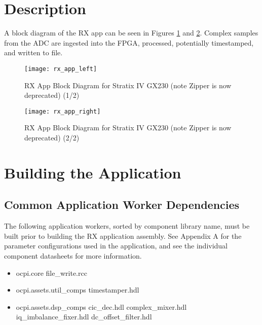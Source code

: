 \section{Description}
A block diagram of the RX app can be seen in Figures \ref{fig:rx_app_left} and \ref{fig:rx_app_right}. Complex samples from the ADC are ingested into the FPGA, processed, potentially timestamped, and written to file.
\pagebreak
\begin{landscape}
	\begin{figure}[H]
	 	\centering
		\texttt{[image: rx\_app\_left]}
		\caption{RX App Block Diagram for Stratix IV GX230 (note Zipper is now deprecated) (1/2)}
		\label{fig:rx_app_left}
	\end{figure}
	\begin{figure}[H]
	 	\centering
		\texttt{[image: rx\_app\_right]}
		\caption{RX App Block Diagram for Stratix IV GX230 (note Zipper is now deprecated) (2/2)}
		\label{fig:rx_app_right}
	\end{figure}
\end{landscape}

\section{Building the Application}
\subsection{Common Application Worker Dependencies}
The following application workers, sorted by component library name, must be built prior to building the RX application assembly. See Appendix A for the parameter configurations used in the application, and see the individual component datasheets for more information.\par\bigskip
	\begin{minipage}[t]{.5\textwidth}
	\begin{itemize}
		\item ocpi.core
			\subitem file\_write.rcc
		\item ocpi.assets.util\_comps
			\subitem timestamper.hdl
		\item ocpi.assets.dsp\_comps
			\subitem cic\_dec.hdl
			\subitem complex\_mixer.hdl
			\subitem iq\_imbalance\_fixer.hdl
			\subitem dc\_offset\_filter.hdl
	\end{itemize}
	\end{minipage}

